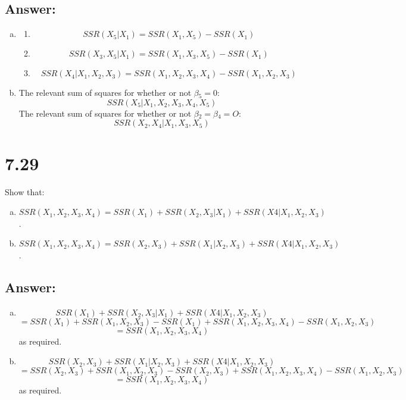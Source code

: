\documentclass{article}
\begin{document}
\subsection{Answer:}

\begin{enumerate}[a)]
\item{}
\begin{enumerate}[1)]
\item{} $$ SSR(X_5|X_1) = SSR(X_1,X_5) - SSR(X_1) $$
\item{} $$ SSR(X_3,X_5|X_1) = SSR(X_1,X_3,X_5) - SSR(X_1) $$
\item{} $$ SSR(X_4|X_1,X_2,X_3) = SSR(X_1,X_2,X_3,X_4) - SSR(X_1,X_2,X_3) $$
\end{enumerate}
\item{} The relevant sum of squares for whether or not $\beta{}_5 = 0$:
$$ SSR(X_5|X_1,X_2,X_3,X_4,X_5) $$
The relevant sum of squares for whether or not $\beta{}_2 = \beta{}_4 = O$:
$$ SSR(X_2,X_4|X_1,X_3,X_5) $$
\end{enumerate}

\section{7.29}

Show that:
\begin{enumerate}[a)]
\item{} $SSR(X_1,X_2,X_3,X_4) = SSR(X_1) + SSR(X_2,X_3|X_1) + SSR(X4|X_1,X_2,X_3)$.
\item{} $SSR(X_1,X_2,X_3,X_4) = SSR(X_2,X_3) + SSR(X_1|X_2,X_3) + SSR(X4|X_1,X_2,X_3)$.
\end{enumerate}

\subsection{Answer:}

\begin{enumerate}[a)]
\item{} $$ SSR(X_1) + SSR(X_2,X_3|X_1) + SSR(X4|X_1,X_2,X_3) $$
$$ = SSR(X_1) + SSR(X_1,X_2,X_3) - SSR(X_1) + SSR(X_1,X_2,X_3,X_4) - SSR(X_1,X_2,X_3) $$
$$ = SSR(X_1,X_2,X_3,X_4) $$
as required.
\item{} $$ SSR(X_2,X_3) + SSR(X_1|X_2,X_3) + SSR(X4|X_1,X_2,X_3) $$
$$ = SSR(X_2,X_3) + SSR(X_1,X_2,X_3) - SSR(X_2,X_3) + SSR(X_1,X_2,X_3,X_4) - SSR(X_1,X_2,X_3) $$
$$ = SSR(X_1,X_2,X_3,X_4) $$
as required.
\end{enumerate}
\end{document}
